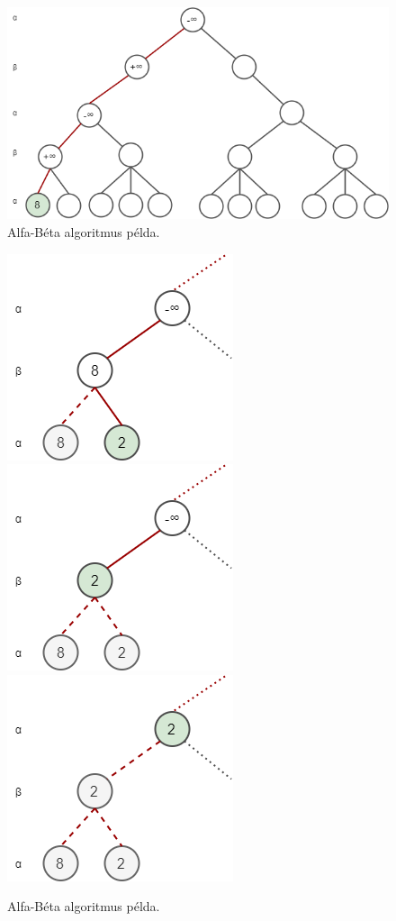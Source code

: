 \documentclass[12pt,margin=0px]{article}
\begin{document}
{    \begin{figure}[H]
		\centering
        \includegraphics[width=0.72\linewidth]{img/alphabeta_01.png}
		\caption{Alfa-Béta algoritmus példa.}
		\label{fig:alphabetaone}
	\end{figure}

    \begin{figure}[H]
		\centering
        \includegraphics[width=0.32\linewidth]{img/alphabeta_02.png}
        \includegraphics[width=0.32\linewidth]{img/alphabeta_03.png}
        \includegraphics[width=0.32\linewidth]{img/alphabeta_04.png}
		\caption{Alfa-Béta algoritmus példa.}
		\label{fig:alphabetatwo}
	\end{figure}

}
\end{document}
